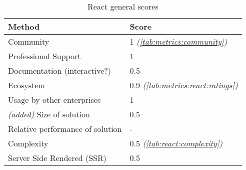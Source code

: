 \begin{table}[H]
    \centering
    \begin{tabular}{|l|l|}
        \hline
        \textbf{Method}                   & \textbf{Score}                                     \\
        \hline
        Community                         & 1 \textit{(\autoref{tab:metrics:community})}       \\ \hline
        Professional Support              & 1                                                  \\ \hline
        Documentation (interactive?)      & 0.5                                                \\ \hline
        Ecosystem                         & 0.9 \textit{(\autoref{tab:metrics:react:ratings})} \\ \hline
        Usage by other enterprises        & 1                                                  \\ \hline
        \textit{(added)} Size of solution & 0.5                                                \\ \hline
        Relative performance of solution  & -                                                  \\ \hline
        Complexity                        & 0.5 \textit{(\autoref{tab:react:complexity})}      \\ \hline
        Server Side Rendered (SSR)        & 0.5                                                \\ \hline
    \end{tabular}
    \caption{React general scores}
    \label{tab:react:scores}
\end{table}
